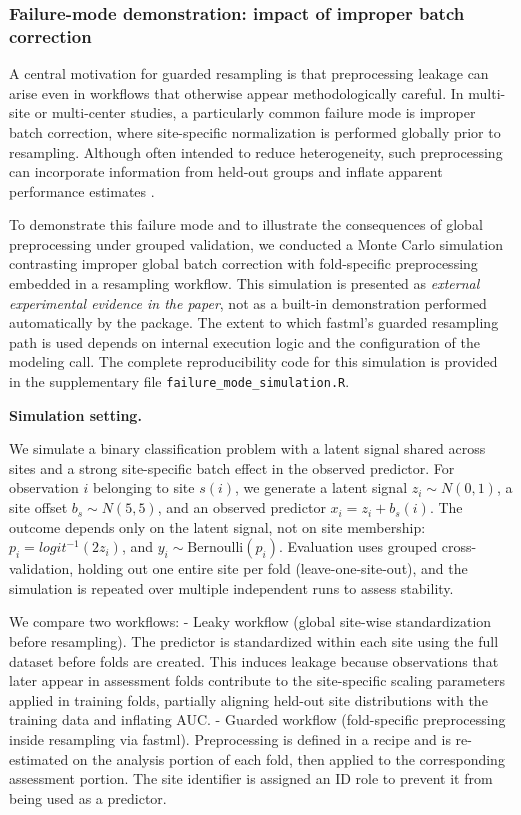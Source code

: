 \subsubsection{Failure-mode demonstration: impact of improper batch correction}\label{failure-mode-demonstration-impact-of-improper-batch-correction}

A central motivation for guarded resampling is that preprocessing leakage can arise even in workflows that otherwise appear methodologically careful. In multi-site or multi-center studies, a particularly common failure mode is improper batch correction, where site-specific normalization is performed globally prior to resampling. Although often intended to reduce heterogeneity, such preprocessing can incorporate information from held-out groups and inflate apparent performance estimates \citep{Luo:2010aa}.

To demonstrate this failure mode and to illustrate the consequences of global preprocessing under grouped validation, we conducted a Monte Carlo simulation contrasting improper global batch correction with fold-specific preprocessing embedded in a resampling workflow. This simulation is presented as \emph{external experimental evidence in the paper}, not as a built-in demonstration performed automatically by the package. The extent to which fastml's guarded resampling path is used depends on internal execution logic and the configuration of the modeling call. The complete reproducibility code for this simulation is provided in the supplementary file \texttt{failure\_mode\_simulation.R}.

\textbf{Simulation setting.}

We simulate a binary classification problem with a latent signal shared across sites and a strong site-specific batch effect in the observed predictor. For observation \(i\) belonging to site \(s(i)\), we generate a latent signal \(z_i \sim N(0,1)\), a site offset \(b_s \sim N(5,5)\), and an observed predictor \(x_i=z_i+b_s(i)\). The outcome depends only on the latent signal, not on site membership: \(p_i = logit^{-1}(2z_i)\), and \(y_i \sim \text{Bernoulli}(p_i)\). Evaluation uses grouped cross-validation, holding out one entire site per fold (leave-one-site-out), and the simulation is repeated over multiple independent runs to assess stability.

We compare two workflows:
- Leaky workflow (global site-wise standardization before resampling). The predictor is standardized within each site using the full dataset before folds are created. This induces leakage because observations that later appear in assessment folds contribute to the site-specific scaling parameters applied in training folds, partially aligning held-out site distributions with the training data and inflating AUC.
- Guarded workflow (fold-specific preprocessing inside resampling via fastml). Preprocessing is defined in a recipe and is re-estimated on the analysis portion of each fold, then applied to the corresponding assessment portion. The site identifier is assigned an ID role to prevent it from being used as a predictor.

